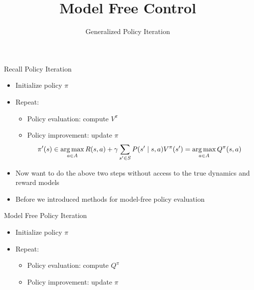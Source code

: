 


\title[RL: Model Free Control]{Model Free Control}
\subtitle{Generalized Policy Iteration}




	
	\maketitle

\begin{frame}[c]{Recall Policy Iteration}

\begin{itemize}
	\item Initialize policy $\pi$
	\item Repeat:
	\begin{itemize}
		\item Policy evaluation: compute $V^\pi$
		\item Policy improvement: update $\pi$
	$$\pi'(s) \in \operatorname*{arg\,max}_{a \in A} R(s,a) + \gamma \sum_{s' \in S} P(s' \mid s,a) V^\pi (s') = \operatorname*{arg\,max}_{a \in A} Q^\pi (s,a) $$
	\end{itemize}
	\item Now want to do the above two steps \alert{without} access to the true dynamics and reward models
	\item Before we introduced methods for model-free policy evaluation
\end{itemize}

\end{frame}
\begin{frame}[c]{Model Free Policy Iteration}
	
	\begin{itemize}
		\item Initialize policy $\pi$
		\item Repeat:
		\begin{itemize}
			\item Policy evaluation: compute $Q^\pi$
			\item Policy improvement: update $\pi$
		\end{itemize}
	\end{itemize}
	
\end{frame}
